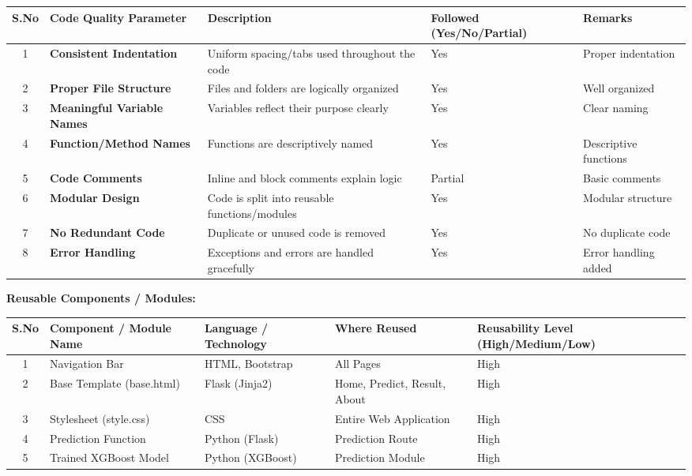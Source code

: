 \documentclass[11pt, a4paper]{article}
\begin{document}
\noindent
\begin{longtable}{|c|>{\bfseries}p{}|p{}|>{\centering\arraybackslash}p{}|p{}|}
\hline
\textbf{S.No} & \textbf{Code Quality Parameter} & \textbf{Description} & \textbf{Followed (Yes/No/Partial)} & \textbf{Remarks} \\ \hline
\endfirsthead
\endhead %
\endfoot %
\endlastfoot

1 & Consistent Indentation & Uniform spacing/tabs used throughout the code & Yes & Proper indentation \\ \hline
2 & Proper File Structure & Files and folders are logically organized & Yes & Well organized \\ \hline
3 & Meaningful Variable Names & Variables reflect their purpose clearly & Yes & Clear naming \\ \hline
4 & Function/Method Names & Functions are descriptively named & Yes & Descriptive functions \\ \hline
5 & Code Comments & Inline and block comments explain logic & Partial & Basic comments \\ \hline
6 & Modular Design & Code is split into reusable functions/modules & Yes & Modular structure \\ \hline
7 & No Redundant Code & Duplicate or unused code is removed & Yes & No duplicate code \\ \hline
8 & Error Handling & Exceptions and errors are handled gracefully & Yes & Error handling added \\ \hline
\end{longtable}

\vspace{1em}

\textbf{Reusable Components / Modules:}

\noindent
\begin{longtable}{|c|p{}|p{}|p{}|>{\centering\arraybackslash}p{}|}
\hline
\textbf{S.No} & \textbf{Component / Module Name} & \textbf{Language / Technology} & \textbf{Where Reused} & \textbf{Reusability Level (High/Medium/Low)} \\ \hline
\endfirsthead
\endhead
\endfoot
\endlastfoot

1 & Navigation Bar & HTML, Bootstrap & All Pages & High \\ \hline
2 & Base Template (base.html) & Flask (Jinja2) & Home, Predict, Result, About & High \\ \hline
3 & Stylesheet (style.css) & CSS & Entire Web Application & High \\ \hline
4 & Prediction Function & Python (Flask) & Prediction Route & High \\ \hline
5 & Trained XGBoost Model & Python (XGBoost) & Prediction Module & High \\ \hline
\end{longtable}
\end{document}
